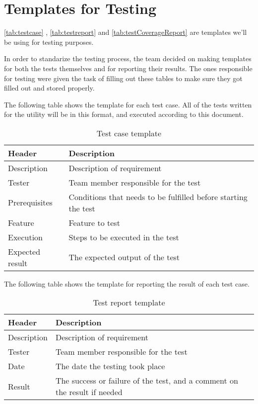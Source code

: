 \section{Templates for Testing}
\autoref{tab:testcase} , \autoref{tab:testreport} and \autoref{tab:testCoverageReport} are templates we'll be
using for testing purposes.

In order to standarize the testing process, the team decided on making templates for both the tests themselves and for reporting their results. The ones responsible for testing were given the task of filling out these tables to make sure they got filled out and stored properly.

The following table shows the template for each test case. All of the tests written for the \gls{utility} will be in this format, and executed according to this document.

\begin{table}[htb] \small \center
\caption{Test case template \label{tab:testcase}}
\begin{tabular}{l l}
	\toprule
	Header & Description \\
	\midrule
	Description & Description of requirement \\
	Tester & Team member responsible for the test \\
	Prerequisites & Conditions that needs to be fulfilled before starting the test \\
	Feature & Feature to test \\
	Execution & Steps to be executed in the test \\
	Expected result & The expected output of the test \\
	\bottomrule
\end{tabular}
\end{table}

The following table shows the template for reporting the result of each test case.

\begin{table}[htb] \small \center
\caption{Test report template \label{tab:testreport}}
\begin{tabular}{l l}
	\toprule
	Header & Description \\
	\midrule
	Description & Description of requirement \\
	Tester & Team member responsible for the test \\
	Date & The date the testing took place \\
	Result & The success or failure of the test, and a comment on the result if needed \\
	\bottomrule
\end{tabular}
\end{table}

